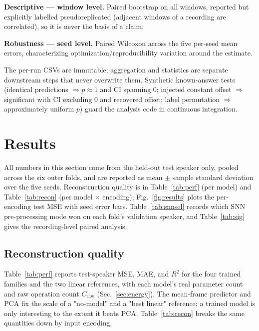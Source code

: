 \documentclass[conference]{IEEEtran}
\begin{document}
\par \textbf{Descriptive --- window level.} Paired bootstrap on all windows,
reported but explicitly labelled pseudoreplicated (adjacent windows of a
recording are correlated), so it is never the basis of a claim.

\par \textbf{Robustness --- seed level.} Paired Wilcoxon across the five
per-seed mean errors, characterizing optimization/reproducibility variation
around the estimate.

\par The per-run CSVs are immutable; aggregation and statistics are separate
downstream steps that never overwrite them. Synthetic known-answer tests
(identical predictions $\Rightarrow p\approx1$ and CI spanning $0$; injected
constant offset $\Rightarrow$ significant with CI excluding $0$ and recovered
offset; label permutation $\Rightarrow$ approximately uniform $p$) guard the
analysis code in continuous integration.

\section{Results}
\label{sec:results}

\par All numbers in this section come from the held-out test speaker only,
pooled across the six outer folds, and are reported as mean $\pm$ sample
standard deviation over the five seeds. Reconstruction quality is in
Table~\ref{tab:perf} (per model) and Table~\ref{tab:recon} (per model $\times$
encoding); Fig.~\ref{fig:results} plots the per-encoding test MSE with seed
error bars. Table~\ref{tab:snnsel} records which SNN pre-processing mode won on
each fold's validation speaker, and Table~\ref{tab:sig} gives the
recording-level paired analysis.

\subsection{Reconstruction quality}

\par Table~\ref{tab:perf} reports test-speaker MSE, MAE, and $R^2$ for the four
trained families and the two linear references, with each model's real
parameter count and raw operation count $C_{\mathrm{raw}}$
(Sec.~\ref{sec:energy}). The mean-frame predictor and PCA fix the scale of a
"no-model" and a "best linear" reference; a trained model is only interesting to
the extent it beats PCA. Table~\ref{tab:recon} breaks the same quantities down
by input encoding.
\end{document}
